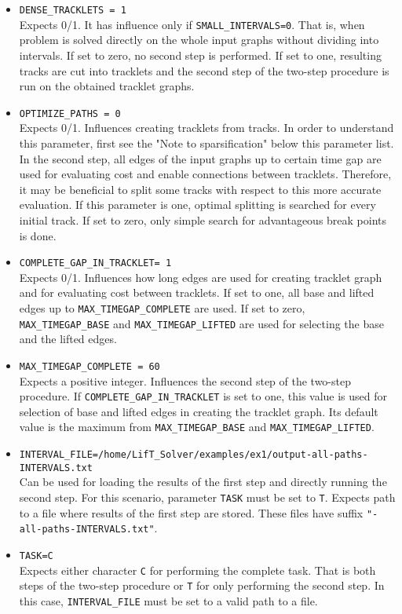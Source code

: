 \documentclass[a4paper,10pt]{article}
\begin{document}
\begin{itemize}
\item \texttt{DENSE\_TRACKLETS = 1}\\
Expects 0/1. It has influence only if \texttt{SMALL\_INTERVALS=0}. That is, when problem is solved directly on the whole input graphs without dividing into intervals. If set to zero, no second step is performed. If set to one, resulting tracks are cut into tracklets and the second step of the two-step procedure is run on the obtained tracklet graphs.

\item \texttt{OPTIMIZE\_PATHS = 0}\\
 Expects 0/1. Influences creating tracklets from tracks. In order to understand this parameter, first see the "Note to sparsification" below this parameter list. In the second step, all edges of the input graphs up to certain time gap are used for evaluating cost and enable connections between tracklets. Therefore, it may be beneficial to split some tracks with respect to this more accurate evaluation. If this parameter is one, optimal splitting is searched for every initial track. If set to zero, only simple search for advantageous break points is done.
 
 \item \texttt{COMPLETE\_GAP\_IN\_TRACKLET= 1 }\\
Expects 0/1. Influences how long edges are used for creating tracklet graph and for evaluating cost between tracklets. If set to one, all base and lifted edges up to \texttt{MAX\_TIMEGAP\_COMPLETE} are used. If set to zero, \texttt{MAX\_TIMEGAP\_BASE} and \texttt{MAX\_TIMEGAP\_LIFTED} are used for selecting the base and the lifted edges.
\item \texttt{MAX\_TIMEGAP\_COMPLETE = 60}\\
Expects a positive integer. Influences the second step of the two-step procedure. If \texttt{COMPLETE\_GAP\_IN\_TRACKLET} is set to one, this value is used for selection of base and lifted edges in creating the tracklet graph.  Its default value is the maximum from \texttt{MAX\_TIMEGAP\_BASE} and \texttt{MAX\_TIMEGAP\_LIFTED}.

\item \texttt{INTERVAL\_FILE=/home/LifT\_Solver/examples/ex1/output-all-paths-INTERVALS.txt}\\
Can be used for loading the results of the first step and directly running the second step. For this scenario, parameter \texttt{TASK} must be set to \texttt{T}. Expects path to a file where results of the first step are stored. These files have suffix \texttt{"-all-paths-INTERVALS.txt"}.
\item \texttt{TASK=C}\\
 Expects either character \texttt{C} for performing the complete task. That is both steps of the two-step procedure or \texttt{T} for only performing the second step. In this case, \texttt{INTERVAL\_FILE} must be set to a valid path to a file.

\end{itemize}
\end{document}

